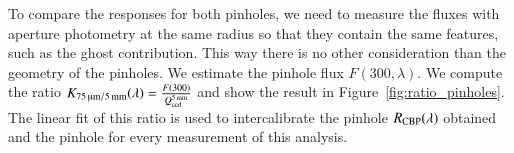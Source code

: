 

To compare the \SD responses for both pinholes, we need to measure the fluxes with aperture photometry at the same radius so that they contain the same features, such as the ghost contribution. This way there is no other consideration than the geometry of the pinholes. We estimate the \spinhole pinhole flux $F(300, \lambda)$. We compute the ratio $K_\mathrm{\SI{75}{\micro\meter}/\SI{5}{\milli\meter}}(\lambda)=\frac{F(300)}{Q_{\mathrm{ccd}}^{\SI{5}{\milli\meter}}}$ and show the result in Figure~\ref{fig:ratio_pinholes}. The linear fit of this ratio is used to intercalibrate the \bpinhole pinhole $R_{\mathrm{CBP}}(\lambda)$ obtained and the \spinhole pinhole \SD for every measurement of this analysis.

